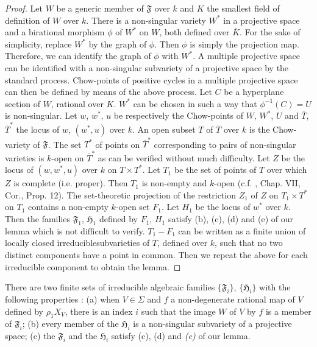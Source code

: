 \begin{proof}
Let $W$ be a generic member of $\mathfrak{F}$ over $k$ and $K$ the smallest field of definition of $W$ over $k$. There is a non-singular variety $W^{*}$ in a projective space and a birational morphism $\phi$ of $W^{*}$ on $W$, both defined over $\overline{K}$. For the sake of simplicity, replace $W^{*}$ by the graph of $\phi$. Then $\phi$ is simply the projection map. Therefore, we can identify the graph of $\phi$ with $W^{*}$. A multiple projective space can be identified with a non-singular subvariety of a projective space by the standard process. Chow-points of positive cycles in a multiple projective space can then be defined by means of the above process. Let $C$ be a hyperplane section of $W$, rational over $K$. $W^{*}$ can be chosen in such a way that $\phi^{-1}(C)=U$ is non-singular. Let $w$, $w^{*}$, $u$ be respectively the Chow-points of $W$, $W^{*}$, $U$ and $\overline{T}$, $\overline{T}^{*}$ the locus of $w$, $(w^{*},u)$ over $k$. An open subset $T$ of $\overline{T}$ over $k$ is the Chow-variety of $\mathfrak{F}$. The set $T^{*}$ of points on $\overline{T}^{*}$ corresponding to pairs of non-singular varieties is $k$-open on $\overline{T}^{*}$ as can be verified without much difficulty. Let $Z$ be the locus of $(w,w^{*},u)$ over $k$ on $T\times T^{*}$. Let $T_{1}$ be the set of points of $T$ over which $Z$ is complete (i.e. proper). Then $T_{1}$ is non-empty and $k$-open (c.f. \cite{art14-key25}, Chap. VII, Cor., Prop. 12). The set-theoretic projection of the restriction $Z_{1}$ of $Z$ on $T_{1}\times T^{*}$ on $T_{1}$ contains a non-empty $k$-open set $F_{1}$. Let $H_{1}$ be the locus of $w^{*}$ over $k$. Then the families $\mathfrak{F}_{1}$, $\mathfrak{H}_{1}$ defined by $F_{1}$, $H_{1}$ satisfy (b), (c), (d) and (e) of our lemma which is not difficult to verify. $T_{1}-F_{1}$ can be written as a finite union of locally closed irreducible\pageoriginale subvarieties of $T$, defined over $k$, such that no two distinct components have a point in common. Then we repeat the above for each irreducible component to obtain the lemma.
\end{proof}

\begin{coro*}
There are two finite sets of irreducible algebraic families $\{\mathfrak{F}_{i}\}$, $\{\mathfrak{H}_{i}\}$ with the following properties : {\rm(a)} when $V\in \Sigma$ and $f$ a non-degenerate rational map of $V$ defined by $\rho_{1}X_{V}$, there is an index $i$ such that the image $W$ of $V$ by $f$ is a member of $\mathfrak{F}_{i}$; {\rm(b)} every member of the $\mathfrak{H}_{i}$ is a non-singular subvariety of a projective space; {\rm(c)} the $\mathfrak{F}_{i}$ and the $\mathfrak{H}_{i}$ satisfy {\rm(c), (d)} and {\em(e)} of our lemma.
\end{coro*}

